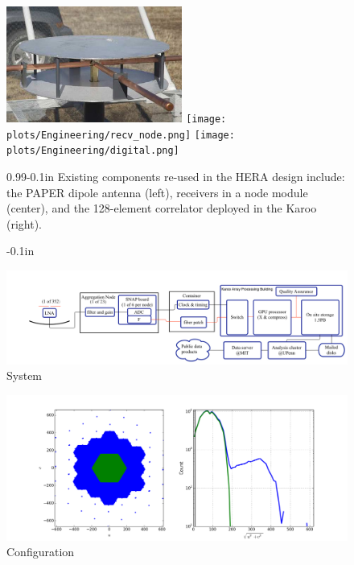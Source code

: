 \documentclass[ars]{/Users/daviddeboer1/Documents/Papers/Copernicus_LaTeX_Package_v_2_7/copernicus}
\begin{document}
\begin{figure}[t]
    \centering
        \includegraphics[height=1.5in]{plots/new_antenna_closeup.jpg}
        \texttt{[image: plots/Engineering/recv\_node.png]}
        \texttt{[image: plots/Engineering/digital.png]}
    \caption{-0.1in}{0.99}{-0.1in}{\small
    Existing components re-used in the HERA design include:
    the PAPER dipole antenna (left), 
    receivers in a node module (center), and
    the 128-element correlator deployed in the Karoo (right).
}\label{fig:components}
\end{figure}


\begin{figure}[t]
\vspace*{2mm}
\begin{center}
\includegraphics[width=12cm]{plots/HERA_high_level_block_diagram.png}
\end{center}
\caption{System  \label{fig:systemOverview}}
\end{figure}

\begin{figure}[t]
\vspace*{2mm}
\begin{center}
\includegraphics[width=12cm]{plots/config.png}
\end{center}
\caption{Configuration  \label{fig:config}}
\end{figure}
\end{document}
